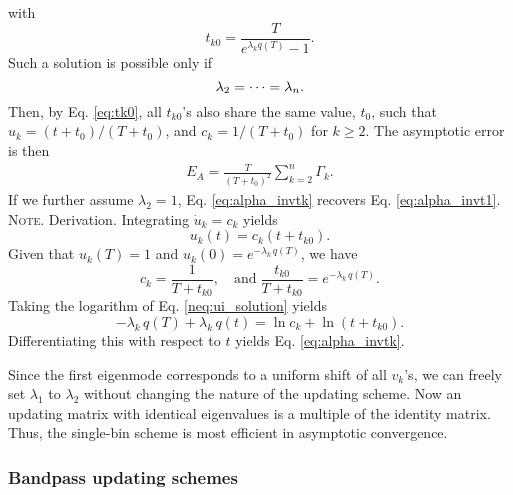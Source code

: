 \documentclass[reprint, floatfix]{revtex4-1}
\newcommand{\note}[1]{{\color{DarkGreen}\footnotesize \textsc{Note.} #1}}
\begin{document}
with
\begin{equation}
  t_{k0} = \frac{             T            }
                { e^{ \lambda_k q(T) } - 1 }.
\label{eq:tk0}
\end{equation}
%
Such a solution is possible only if
%
\begin{equation}
  \lambda_2 = \dots = \lambda_n.
  \notag
\end{equation}
%
Then, by Eq. \eqref{eq:tk0},
all $t_{k0}$'s also share the same value,
$t_0$,
such that
$u_k = (t + t_0) / (T + t_0)$,
and
$c_k = 1/(T + t_0)$
for $k \ge 2$.
%
The asymptotic error is then
\begin{align}
  E_A
  =
  \frac{       T     }
       { (T + t_0)^2 }
  \sum_{ k = 2 }^n
    \Gamma_k
  .
\label{eq:error_singlebin}
\end{align}
%
If we further assume $\lambda_2 = 1$,
Eq. \eqref{eq:alpha_invtk}
recovers Eq. \eqref{eq:alpha_invt1}.
%
\note{Derivation.
  Integrating $\dot u_k = c_k$ yields
  \begin{equation}
    u_k(t) = c_k \left(t + t_{k0} \right).
  \tag{UK}
  \label{neq:ui_solution}
  \end{equation}
  Given that $u_k(T) = 1$ and $u_k(0) = e^{-\lambda_k \, q(T)}$,
  we have
  $$
  c_k = \frac{ 1 }{ T + t_{k0} },
  \quad
  \mathrm{and\;}
  \frac{ t_{k0} } { T + t_{k0} }
  =
  e^{ -\lambda_k \, q(T) }.
  $$
  Taking the logarithm of Eq. \eqref{neq:ui_solution} yields
  $$
  -\lambda_k \, q(T) + \lambda_k \, q(t)
  = \ln c_k + \ln \left( t + t_{k0} \right).
  $$
  Differentiating this with respect to $t$ yields
  Eq. \eqref{eq:alpha_invtk}.
}

Since the first eigenmode corresponds to
a uniform shift of all $v_k$'s,
we can freely set $\lambda_1$ to $\lambda_2$
without changing the nature of the updating scheme.
%
Now an updating matrix
with identical eigenvalues
is a multiple of the identity matrix.
%
Thus,
the single-bin scheme is most efficient
in asymptotic convergence.



\subsubsection{\label{sec:optscheme}
Bandpass updating schemes}
\end{document}
